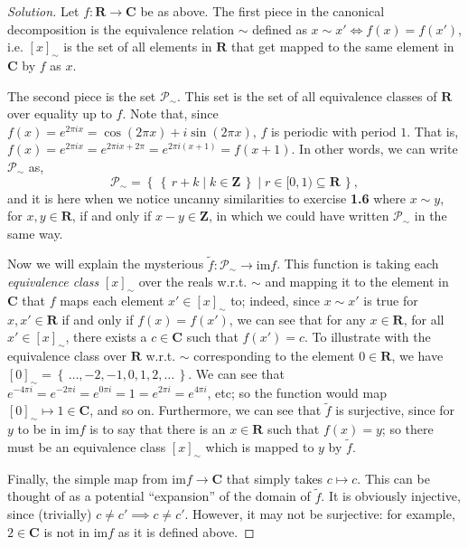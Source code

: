 \documentclass[fontsize=14pt]{scrartcl}
\theoremstyle{definition}
\newenvironment{solution}{
  \begin{proof}[Solution]
  \vspace{-8px}
  \setlength{\parskip}{4px}
  \setlength{\parindent}{0px}
}{
  \end{proof}
}
\newcommand{\set}[1]{\left\{\,#1\,\right\}}
\newcommand{\im}{\mathrm{im}}
\begin{document}
\begin{solution}
Let $f:\mathbf{R}\to\mathbf{C}$ be as above. The first piece in the canonical
decomposition is the equivalence relation $\sim$ defined as $x \sim x' \iff f(x) =
f(x')$, i.e. $[x]_{\sim}$ is the set of all elements in $\mathbf{R}$ that get
mapped to the same element in $\mathbf{C}$ by $f$ as $x$.

The second piece is the set $\mathscr{P}_{\sim}$. This set is the set of all
equivalence classes of $\mathbf{R}$ over equality up to $f$. Note that, since
$f(x) = e^{2\pi i x} = \cos(2\pi x) + i\sin(2\pi x)$, $f$ is periodic with
period $1$. That is, $f(x) = e^{2\pi i x} = e^{2\pi i x + 2\pi} = e^{2\pi i (x +
1)} = f(x+1)$. In other words, we can write $\mathscr{P}_{\sim}$ as,
%
\[ \mathscr{P}_{\sim} = \set{\set{r + k\mid k\in\mathbf{Z}}\mid
r\in[0,1)\subseteq\mathbf{R}}, \]
%
and it is here when we notice uncanny similarities to exercise \textbf{1.6}
where $x\sim y$, for $x,y\in\mathbf{R}$, if and only if $x-y\in\mathbf{Z}$, in
which we could have written $\mathscr{P}_{\sim}$ in the same way. 

Now we will explain the mysterious $\tilde{f}:\mathscr{P}_{\sim}\to\im f$. This
function is taking each \textit{equivalence class} $[x]_{\sim}$ over the reals
w.r.t. $\sim$ and mapping it to the element in $\mathbf{C}$ that $f$ maps each
element $x'\in[x]_{\sim}$ to; indeed, since $x\sim x'$ is true for
$x,x'\in\mathbf{R}$ if and only if $f(x)=f(x')$, we can see that for any
$x\in\mathbf{R}$, for all $x'\in[x]_{\sim}$, there exists a $c\in\mathbf{C}$
such that $f(x') = c$. To illustrate with the equivalence class over
$\mathbf{R}$ w.r.t. $\sim$ corresponding to the element $0\in\mathbf{R}$, we
have $[0]_{\sim} = \set{\dots, -2, -1, 0, 1, 2, \dots}$.  We can see that
$e^{-4\pi i} = e^{-2\pi i} = e^{0\pi i} = 1 = e^{2\pi i} = e^{4\pi i}$, etc; so
the function would map $[0]_{\sim}\mapsto1\in\mathbf{C}$, and so on.
Furthermore, we can see that $\tilde{f}$ is surjective, since for $y$ to be in
$\im f$ is to say that there is an $x\in\mathbf{R}$ such that $f(x) = y$; so
there must be an equivalence class $[x]_{\sim}$ which is mapped to $y$ by
$\tilde{f}$.

Finally, the simple map from $\im f\to\mathbf{C}$ that simply takes $c\mapsto
c$. This can be thought of as a potential ``expansion'' of the domain of
$\tilde{f}$. It is obviously injective, since (trivially) $c\neq c'\implies
c\neq c'$. However, it may not be surjective: for example, $2\in\mathbf{C}$ is
not in $\im f$ as it is defined above.
\end{solution}
\end{document}
